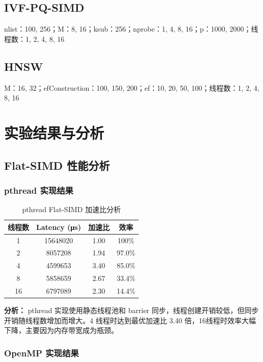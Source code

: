 \documentclass[a4paper]{article}
\begin{document}
\subsection{IVF-PQ-SIMD}
nlist：100, 256；M：8, 16；ksub：256；nprobe：1, 4, 8, 16；p：1000, 2000；线程数：1, 2, 4, 8, 16

\subsection{HNSW}
M：16, 32；efConstruction：100, 150, 200；ef：10, 20, 50, 100；线程数：1, 2, 4, 8, 16

\section{实验结果与分析}

\subsection{Flat-SIMD 性能分析}

\subsubsection{pthread 实现结果}

\begin{table}[htbp]
\centering
\caption{pthread Flat-SIMD 加速比分析}
\begin{tabular}{cccc}
\toprule
线程数 & Latency (μs) & 加速比 & 效率 \\
\midrule
1 & 15648020 & 1.00 & 100\% \\
2 & 8057208 & 1.94 & 97.0\% \\
4 & 4599653 & 3.40 & 85.0\% \\
8 & 5858659 & 2.67 & 33.4\% \\
16 & 6797089 & 2.30 & 14.4\% \\
\bottomrule
\end{tabular}
\end{table}

\textbf{分析：} pthread 实现使用静态线程池和 barrier 同步，线程创建开销较低，但同步开销随线程数增加而增大。4 线程时达到最优加速比 3.40 倍，16线程时效率大幅下降，主要因为内存带宽成为瓶颈。

\subsubsection{OpenMP 实现结果}
\end{document}
